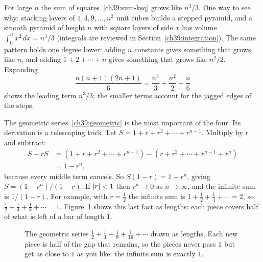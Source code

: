 For large $n$ the sum of squares~\eqref{ch39:sum-ksq} grows like $n^3/3$. One way to see why:
stacking layers of $1, 4, 9, \dots, n^2$ unit cubes builds a stepped pyramid, and a smooth pyramid of
height $n$ with square layers of side $x$ has volume $\int_0^n x^2\,dx = n^3/3$ (integrals are
reviewed in Section~\ref{ch39:integration}). The same pattern holds one degree lower: adding $n$
constants gives something that grows like $n$, and adding $1 + 2 + \cdots + n$ gives something that
grows like $n^2/2$. Expanding
\[
\frac{n(n+1)(2n+1)}{6} = \frac{n^3}{3} + \frac{n^2}{2} + \frac{n}{6}
\]
shows the leading term $n^3/3$; the smaller terms account for the jagged edges of the steps.

The geometric series~\eqref{ch39:geometric} is the most important of the four. Its derivation is a
telescoping trick. Let $S = 1 + r + r^2 + \cdots + r^{n-1}$. Multiply by $r$ and subtract:
\begin{align*}
S - rS &= (1 + r + r^2 + \cdots + r^{n-1}) - (r + r^2 + \cdots + r^{n-1} + r^n)\\
&= 1 - r^n,
\end{align*}
because every middle term cancels. So $S(1-r) = 1 - r^n$, giving $S = (1-r^n)/(1-r)$. If
$\lvert r\rvert < 1$ then $r^n \to 0$ as $n \to \infty$, and the infinite sum is $1/(1-r)$. For example,
with $r = \tfrac12$ the infinite sum is $1 + \tfrac12 + \tfrac14 + \cdots = 2$, so
$\tfrac12 + \tfrac14 + \tfrac18 + \cdots = 1$. Figure~\ref{ch39:fig-geometric} shows this last fact
as lengths: each piece covers half of what is left of a bar of length $1$.

\begin{figure}[htbp]
\centering
{}
\caption{The geometric series $\tfrac12 + \tfrac14 + \tfrac18 + \tfrac1{16} + \cdots$ drawn as
lengths. Each new piece is half of the gap that remains, so the pieces never pass $1$ but get as close
to $1$ as you like: the infinite sum is exactly $1$.}
\label{ch39:fig-geometric}
\end{figure}


